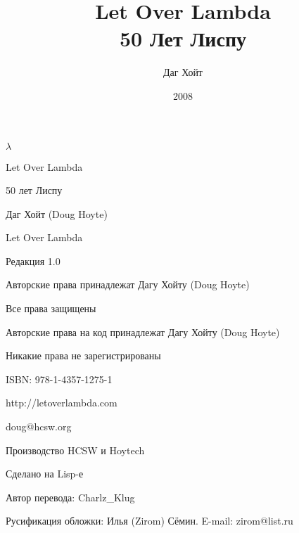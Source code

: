 \documentclass[a4paper, 12pt]{book}
\title{Let Over Lambda \\50 Лет Лиспу}
\date{2008}
\author{Даг Хойт}
\begin{document}
\newcommand{\listbegin} {\hrule}
\newcommand{\listend} {\hrule\vspace{0.1cm}}








\renewcommand {\contentsname} {Оглавление}
\renewcommand {\chaptername} {Глава}
%
\maketitle
\begin{center}
{\LARGE $\lambda$}


Let Over Lambda

50 лет Лиспу

Даг Хойт (Doug Hoyte)

Let Over Lambda

Редакция 1.0

Авторские права принадлежат Дагу Хойту (Doug Hoyte)

Все права защищены

Авторские права на код принадлежат Дагу Хойту (Doug Hoyte)

Никакие права не зарегистрированы

ISBN: 978-1-4357-1275-1

http://letoverlambda.com

doug@hcsw.org

Производство HCSW и Hoytech

Сделано на Lisp-е

Автор перевода: Charlz\_Klug

Русификация обложки: Илья (Zirom) Сёмин. E-mail: zirom@list.ru
\end{center}
\tableofcontents






\newpage 

\end{document}
